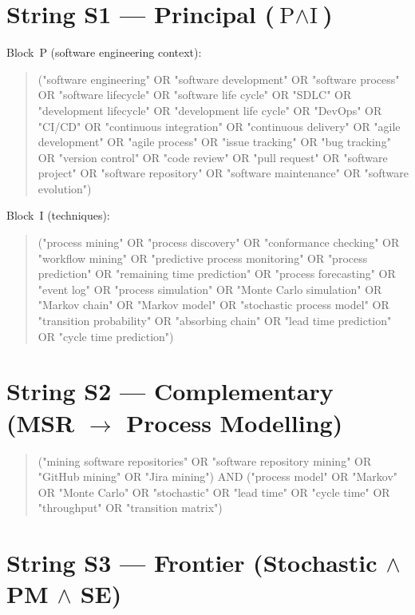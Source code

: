 \section{String S1 --- Principal ($\text{P} \wedge \text{I}$)}
\label{app:slr-s1}

Block~P (software engineering context):

\begin{quote}
\small\ttfamily
("software engineering" OR "software development" OR "software process"
OR "software lifecycle" OR "software life cycle" OR "SDLC" OR "development
lifecycle" OR "development life cycle" OR "DevOps" OR "CI/CD" OR "continuous
integration" OR "continuous delivery" OR "agile development" OR "agile process"
OR "issue tracking" OR "bug tracking" OR "version control" OR "code review" OR
"pull request" OR "software project" OR "software repository" OR "software
maintenance" OR "software evolution")
\end{quote}

Block~I (techniques):

\begin{quote}
\small\ttfamily
("process mining" OR "process discovery" OR "conformance checking" OR
"workflow mining" OR "predictive process monitoring" OR "process prediction" OR
"remaining time prediction" OR "process forecasting" OR "event log" OR "process
simulation" OR "Monte Carlo simulation" OR "Markov chain" OR "Markov model" OR
"stochastic process model" OR "transition probability" OR "absorbing chain" OR
"lead time prediction" OR "cycle time prediction")
\end{quote}

\section{String S2 --- Complementary (MSR $\rightarrow$ Process Modelling)}
\label{app:slr-s2}

\begin{quote}
\small\ttfamily
("mining software repositories" OR "software repository mining" OR
"GitHub mining" OR "Jira mining") AND ("process model" OR "Markov" OR "Monte
Carlo" OR "stochastic" OR "lead time" OR "cycle time" OR "throughput" OR
"transition matrix")
\end{quote}

\section{String S3 --- Frontier (Stochastic $\wedge$ PM $\wedge$ SE)}
\label{app:slr-s3}

